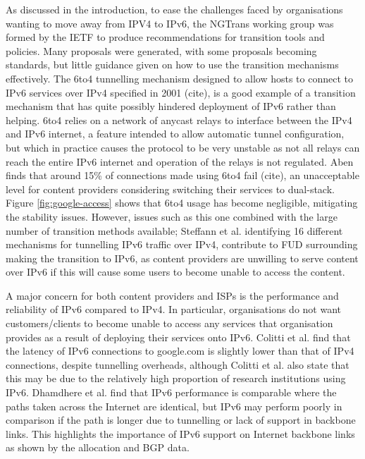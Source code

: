 As discussed in the introduction, to ease the challenges faced by organisations
wanting to move away from IPV4 to IPv6, the NGTrans working group was formed by
the IETF to produce recommendations for transition tools and policies. Many
proposals were generated, with some proposals becoming standards, but little
guidance given on how to use the transition mechanisms effectively. The 6to4
tunnelling mechanism designed to allow hosts to connect to IPv6 services over
IPv4 specified in 2001 (cite), is a good example of a transition mechanism that
has quite possibly hindered deployment of IPv6 rather than helping. 6to4 relies
on a network of anycast relays to interface between the IPv4 and IPv6 internet,
a feature intended to allow automatic tunnel configuration, but which in
practice causes the protocol to be very unstable as not all relays can reach the
entire IPv6 internet and operation of the relays is not regulated. Aben finds
that around 15\% of connections made using 6to4 fail (cite), an unacceptable
level for content providers considering switching their services to dual-stack.
Figure \ref{fig:google-access} shows that 6to4 usage has become negligible,
mitigating the stability issues. However, issues such as this one combined with
the large number of transition methods available; Steffann et al.
identifying 16 different mechanisms for tunnelling IPv6 traffic over IPv4,
contribute to FUD surrounding making the transition to IPv6, as content
providers are unwilling to serve content over IPv6 if this will cause some users
to become unable to access the content.

A major concern for both content providers and ISPs is the performance and
reliability of IPv6 compared to IPv4. In particular, organisations do not want
customers/clients to become unable to access any services that organisation
provides as a result of deploying their services onto IPv6. Colitti et al. find
that the latency of IPv6 connections to google.com is slightly lower than that
of IPv4 connections, despite tunnelling overheads, although Colitti et al. also
state that this may be due to the relatively high proportion of research
institutions using IPv6. Dhamdhere et al. find that IPv6 performance is
comparable where the paths taken across the Internet are identical, but IPv6 may
perform poorly in comparison if the path is longer due to tunnelling or lack of support in
backbone links. This highlights the importance of IPv6 support on Internet
backbone links as shown by the allocation and BGP data.

